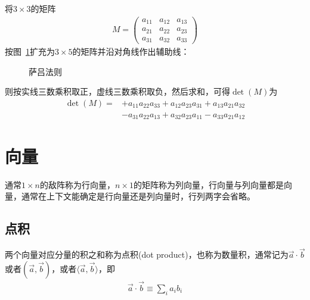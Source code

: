 \begin{example}
  将$3\times 3$的矩阵
  \begin{align*}
    M =
    \begin{pmatrix}
      a_{11} & a_{12} & a_{13}\\
      a_{21} & a_{22} & a_{23}\\
      a_{31} & a_{32} & a_{33}
    \end{pmatrix}
  \end{align*}
  按图~\ref{fig:Sarrus'-rule}扩充为$3\times 5$的矩阵并沿对角线作出辅助线：
  \begin{figure}[htbp]
    \centering
    \caption{萨吕法则}
    \label{fig:Sarrus'-rule}
  \end{figure}
  
  则按实线三数乘积取正，虚线三数乘积取负，然后求和，可得$\det(M)$为
  \begin{align*}
    \det(M) ={}& +a_{11}a_{22}a_{33} + a_{12}a_{23}a_{31} + a_{13}a_{21}a_{32}\\
               & -a_{31}a_{22}a_{13} + a_{32}a_{23}a_{11} - a_{33}a_{21}a_{12}
  \end{align*}
\end{example}


\section{向量}
\label{sec:vector}

通常$1\times n$的敌阵称为行向量，$n\times 1$的矩阵称为列向量，行向量与列向量都是向量，通常在上下文能确定是行向量还是列向量时，行列两字会省略。

\subsection{点积}
\label{sec:dot-product-of-vector}
\begin{definition}
  两个向量对应分量的积之和称为点积(dot product)，也称为数量积，通常记为$\vec a\cdot\vec b$或者$(\vec a,\vec b)$，或者$\langle\vec a,\vec b\rangle$，即
  \begin{align*}
    \vec{a}\cdot \vec b\equiv\sum_i a_ib_i
  \end{align*}
\end{definition}

